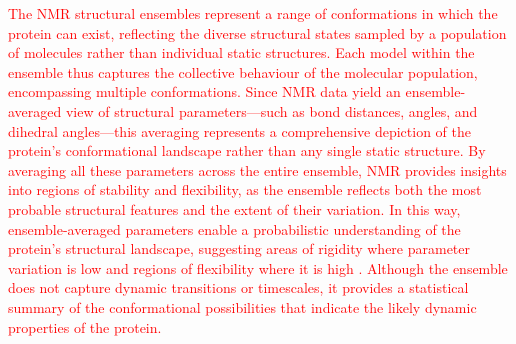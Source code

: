 \textcolor{red}{The NMR structural ensembles represent a range of conformations in which the protein can exist, reflecting the diverse structural states sampled by a population of molecules rather than individual static structures. Each model within the ensemble thus captures the collective behaviour of the molecular population, encompassing multiple conformations. Since NMR data yield an ensemble-averaged view of structural parameters---such as bond distances, angles, and dihedral angles---this averaging represents a comprehensive depiction of the protein’s conformational landscape rather than any single static structure. By averaging all these parameters across the entire ensemble, NMR provides insights into regions of stability and flexibility, as the ensemble reflects both the most probable structural features and the extent of their variation. In this way, ensemble-averaged parameters enable a probabilistic understanding of the protein’s structural landscape, suggesting areas of rigidity where parameter variation is low and regions of flexibility where it is high \cite{sutcliffe_representing_1993, stockelmaier_conformational_2024}. Although the ensemble does not capture dynamic transitions or timescales, it provides a statistical summary of the conformational possibilities that indicate the likely dynamic properties of the protein.}







